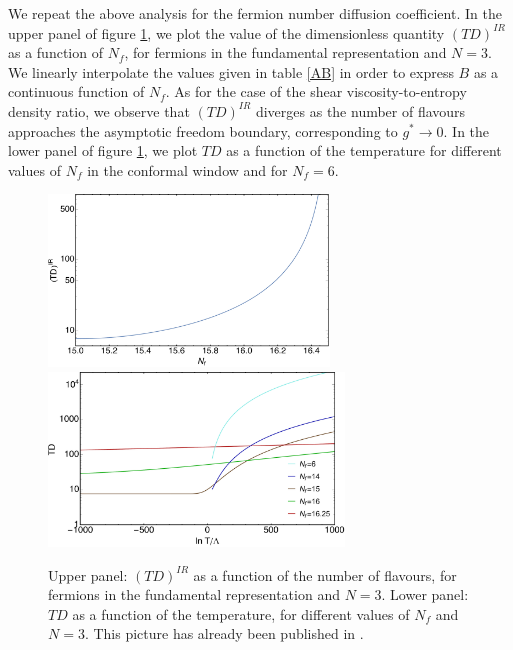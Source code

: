   
We repeat the above analysis for the fermion number diffusion coefficient. In the upper panel of figure \ref{D_Nf}, we plot the value of the dimensionless quantity $(T D)^{IR}$ as a function of $N_f$, for fermions in the fundamental representation and $N=3$. We linearly interpolate the values given in table \ref{AB} in order to express $B$ as a continuous function of $N_f$.
As for the case of the shear viscosity-to-entropy density ratio, we observe that $(TD)^{IR}$ diverges as the number of flavours approaches the asymptotic freedom boundary, corresponding to $g^* \to 0$. In the lower panel of figure \ref{D_Nf}, we plot $T D$ as a function of the temperature for different values of $N_f$ in the conformal window and for $N_f=6$. 

\begin{figure}[h!]
\begin{center}
\includegraphics[width=0.665\textwidth]{pics/TDaN3} \\
\includegraphics[width=0.7\textwidth]{pics/Temperature-TDaN3}
\end{center}
\caption{Upper panel: $(T D)^{IR}$ as a function of the number of flavours, for fermions in the fundamental representation and $N=3$. Lower panel: $T D$ as a function of the temperature, for different values of $N_f$ and $N=3$. This picture has already been published in \cite{Toniato:2016twr}.}
\label{D_Nf}
\end{figure}

